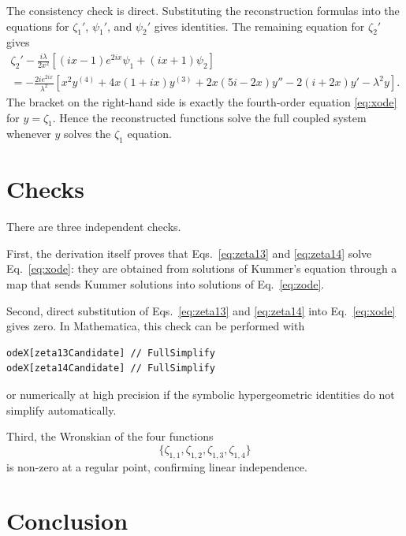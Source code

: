 \documentclass[%
 aip,
 jmp,%
 amsmath,amssymb,
 reprint,%
]{revtex4-2}
\begin{document}
The consistency check is direct.  Substituting the reconstruction formulas into
the equations for $\zeta_1'$, $\psi_1'$, and $\psi_2'$ gives identities.  The
remaining equation for $\zeta_2'$ gives
\begin{equation}
\label{eq:zeta2residual}
\begin{multlined}
\zeta_2'
-
\frac{i\lambda}{2x^2}
\left[(ix-1)e^{2ix}\psi_1+(ix+1)\psi_2\right]\\
=
-\frac{2ie^{2ix}}{\lambda^2}
\left[
x^2y^{(4)}
+4x(1+ix)y^{(3)}
+2x(5i-2x)y''
-2(i+2x)y'
-\lambda^2 y
\right].
\end{multlined}
\end{equation}
The bracket on the right-hand side is exactly the fourth-order equation
\eqref{eq:xode} for $y=\zeta_1$.  Hence the reconstructed functions solve the
full coupled system whenever $y$ solves the $\zeta_1$ equation.

\section{Checks}

There are three independent checks.

First, the derivation itself proves that Eqs.~\eqref{eq:zeta13} and
\eqref{eq:zeta14} solve Eq.~\eqref{eq:xode}: they are obtained from solutions
of Kummer's equation through a map that sends Kummer solutions into solutions
of Eq.~\eqref{eq:zode}.

Second, direct substitution of Eqs.~\eqref{eq:zeta13} and \eqref{eq:zeta14}
into Eq.~\eqref{eq:xode} gives zero.  In Mathematica, this check can be
performed with
\begin{verbatim}
odeX[zeta13Candidate] // FullSimplify
odeX[zeta14Candidate] // FullSimplify
\end{verbatim}
or numerically at high precision if the symbolic hypergeometric identities do
not simplify automatically.

Third, the Wronskian of the four functions
\begin{equation}
\{\zeta_{1,1},\zeta_{1,2},\zeta_{1,3},\zeta_{1,4}\}
\end{equation}
is non-zero at a regular point, confirming linear independence.

\section{Conclusion}
\end{document}

